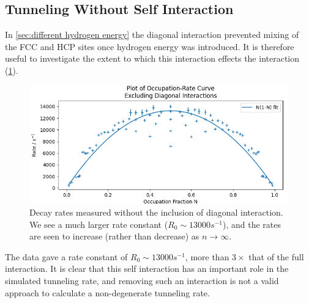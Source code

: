 \subsection{Tunneling Without Self Interaction}\label{sec:tunnelling no diagonal}
In \cref{sec:different hydrogen energy}
the diagonal interaction
prevented mixing of the FCC and HCP
sites once hydrogen energy was introduced.
It is therefore
useful to investigate the extent
to which this interaction
effects the interaction (\cref{fig:non diagonal decay rates}).
\begin{figure}[htbp]
    \centering
    \includegraphics[width=0.7\linewidth]{Figures/Simulation/Occupation Rate Curve No Diagonal.png}
    \caption{Decay rates measured without
        the inclusion of diagonal interaction.
        We see a much larger rate constant (\(R_0 \sim{} 13000 s^{-1}\)),
        and the rates are seen to
        increase (rather than
        decrease) as \(n\rightarrow{}\infty{}\).
    }\label{fig:non diagonal decay rates}
\end{figure}
The data gave
a rate constant
of \(R_0 \sim{} 13000 s^{-1}\),
more than \(3\times{}\) that of
the full interaction.
It is clear that this self interaction
has an important role
in the simulated
tunneling rate, and
removing such an interaction
is not a valid approach to
calculate a non-degenerate
tunneling rate.